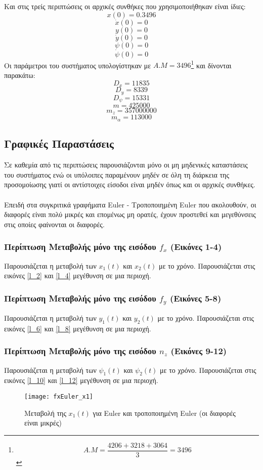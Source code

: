 \documentclass{article}
\begin{document}
Και στις τρείς περιπτώσεις οι αρχικές συνθήκες που χρησιμοποιήθηκαν είναι ίδιες:
\[x(0) = 0.3496\]
\[\dot{x}(0) = 0\]
\[y(0) = 0\]
\[\dot{y}(0) = 0\]
\[\psi(0) = 0\]
\[\dot{\psi}(0) = 0\]
Οι παράμετροι του συστήματος υπολογίστηκαν με \(Α.Μ = 3496\)\footnote{\[A.M = \frac{4206 + 3218 + 3064}{3} = 3496\]} και δίνονται παρακάτω:
\[D_x = 11835\]
\[D_y = 8339\]
\[D_\psi = 15331\]
\[m = 425000\]
\[m_z = 357000000\]
\[m_\alpha = 113000\]

\newpage
\subsection{Γραφικές Παραστάσεις}
Σε καθεμία από τις περιπτώσεις παρουσιάζονται μόνο οι μη μηδενικές καταστάσεις του συστήματος ενώ οι υπόλοιπες παραμένουν μηδέν σε όλη τη διάρκεια της προσομοίωσης γιατί οι αντίστοιχες είσοδοι είναι μηδέν όπως και οι αρχικές συνθήκες.
\\\\
Επειδή στα συγκριτικά γραφήματα Euler - Τροποποιημένη Euler που ακολουθούν, οι διαφορές είναι πολύ μικρές και επομένως μη ορατές, έχουν προστεθεί και μεγεθύνσεις στις οποίες φαίνονται οι διαφορές.
\subsubsection{Περίπτωση Μεταβολής μόνο της εισόδου \(f_x\) (Εικόνες 1-4)}
Παρουσιάζεται η μεταβολή των \(x_1(t)\) και \(x_2(t)\) με το χρόνο. Παρουσιάζεται στις εικόνες \ref{l_2} και \ref{l_4} μεγέθυνση σε μια περιοχή. 

\subsubsection{Περίπτωση Μεταβολής μόνο της εισόδου \(f_y\) (Εικόνες 5-8)}
Παρουσιάζεται η μεταβολή των \(y_1(t)\) και \(y_2(t)\) με το χρόνο. Παρουσιάζεται στις εικόνες \ref{l_6} και \ref{l_8} μεγέθυνση σε μια περιοχή.

\subsubsection{Περίπτωση Μεταβολής μόνο της εισόδου \(n_z\) (Εικόνες 9-12)}
Παρουσιάζεται η μεταβολή των \(\psi_1(t)\) και \(\psi_2(t)\) με το χρόνο. Παρουσιάζεται στις εικόνες \ref{l_10} και \ref{l_12} μεγέθυνση σε μια περιοχή.
\clearpage

\begin{figure}[bh!]
 \centering
\texttt{[image: fxEuler\_x1]}
\caption{Μεταβολή της $x_1(t)$ για Euler και τροποποιημένη
 Euler (οι διαφορές είναι μικρές)}
\end{figure}
\end{document}
